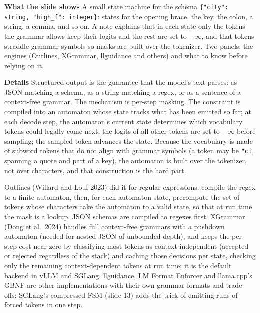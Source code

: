 \documentclass[11pt,letterpaper]{article}
\newcommand{\para}[1]{\medskip\noindent\textbf{#1}\quad}
\begin{document}
\para{What the slide shows} A small state machine for the schema \texttt{\{"city": string, "high\_f": integer\}}: states for the opening brace, the key, the colon, a string, a comma, and so on. A note explains that in each state only the tokens the grammar allows keep their logits and the rest are set to $-\infty$, and that tokens straddle grammar symbols so masks are built over the tokenizer. Two panels: the engines (Outlines, XGrammar, llguidance and others) and what to know before relying on it.

\para{Details} Structured output is the guarantee that the model's text parses: as JSON matching a schema, as a string matching a regex, or as a sentence of a context-free grammar. The mechanism is per-step masking. The constraint is compiled into an automaton whose state tracks what has been emitted so far; at each decode step, the automaton's current state determines which vocabulary tokens could legally come next; the logits of all other tokens are set to $-\infty$ before sampling; the sampled token advances the state. Because the vocabulary is made of subword tokens that do not align with grammar symbols (a token may be \texttt{"ci}, spanning a quote and part of a key), the automaton is built over the tokenizer, not over characters, and that construction is the hard part.

Outlines (Willard and Louf 2023) did it for regular expressions: compile the regex to a finite automaton, then, for each automaton state, precompute the set of tokens whose characters take the automaton to a valid state, so that at run time the mask is a lookup. JSON schemas are compiled to regexes first. XGrammar (Dong et al.\ 2024) handles full context-free grammars with a pushdown automaton (needed for nested JSON of unbounded depth), and keeps the per-step cost near zero by classifying most tokens as context-independent (accepted or rejected regardless of the stack) and caching those decisions per state, checking only the remaining context-dependent tokens at run time; it is the default backend in vLLM and SGLang. llguidance, LM Format Enforcer and llama.cpp's GBNF are other implementations with their own grammar formats and trade-offs; SGLang's compressed FSM (slide 13) adds the trick of emitting runs of forced tokens in one step.
\end{document}
